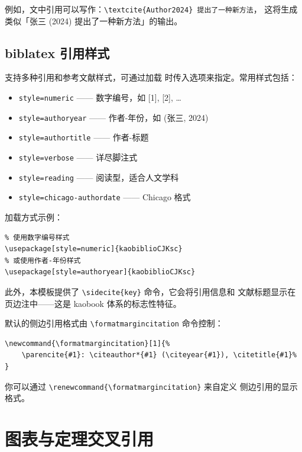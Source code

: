 
例如，文中引用可以写作：\lstinline|\textcite{Author2024} 提出了一种新方法|，
这将生成类似「张三 (2024) 提出了一种新方法」的输出。

\subsection{biblatex 引用样式}

 支持多种引用和参考文献样式，可通过加载
 时传入选项来指定。常用样式包括：

\begin{itemize}
    \item \texttt{style=numeric} —— 数字编号，如 [1], [2], \ldots{}
    \item \texttt{style=authoryear} —— 作者-年份，如 (张三, 2024)
    \item \texttt{style=authortitle} —— 作者-标题
    \item \texttt{style=verbose} —— 详尽脚注式
    \item \texttt{style=reading} —— 阅读型，适合人文学科
    \item \texttt{style=chicago-authordate} —— Chicago 格式
\end{itemize}

加载方式示例：
\begin{lstlisting}
% 使用数字编号样式
\usepackage[style=numeric]{kaobiblioCJKsc}
% 或使用作者-年份样式
\usepackage[style=authoryear]{kaobiblioCJKsc}
\end{lstlisting}

此外，本模板提供了 \lstinline|\sidecite{key}| 命令，它会将引用信息和
文献标题显示在页边注中——这是 kaobook 体系的标志性特征。

默认的侧边引用格式由 \lstinline|\formatmargincitation| 命令控制：
\begin{lstlisting}
\newcommand{\formatmargincitation}[1]{%
    \parencite{#1}: \citeauthor*{#1} (\citeyear{#1}), \citetitle{#1}%
}
\end{lstlisting}

你可以通过 \lstinline|\renewcommand{\formatmargincitation}| 来自定义
侧边引用的显示格式。


\section{图表与定理交叉引用}

